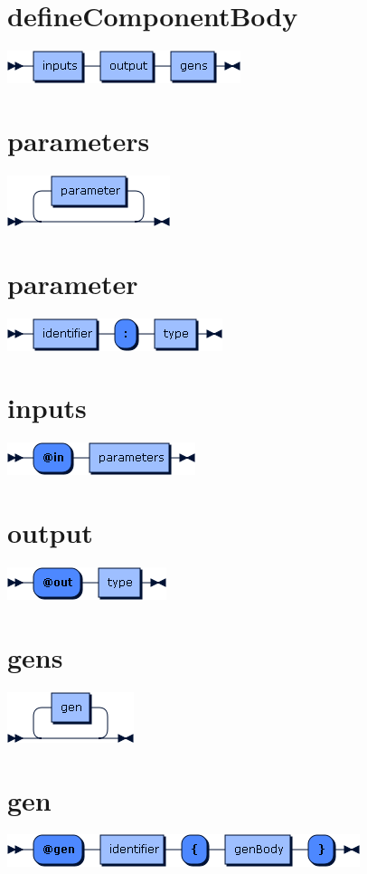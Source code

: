 \begin{appendices}
\section*{defineComponentBody}\includegraphics[scale=0.7]{img/ebnf_grammar/defineComponentBody}

\section*{parameters}\includegraphics[scale=0.7]{img/ebnf_grammar/parameters}
\section*{parameter}\includegraphics[scale=0.7]{img/ebnf_grammar/parameter}

\section*{inputs}\includegraphics[scale=0.7]{img/ebnf_grammar/inputs}
\section*{output}\includegraphics[scale=0.7]{img/ebnf_grammar/output}
\section*{gens}\includegraphics[scale=0.7]{img/ebnf_grammar/gens}
\section*{gen}\includegraphics[scale=0.7]{img/ebnf_grammar/gen}

\end{appendices}
